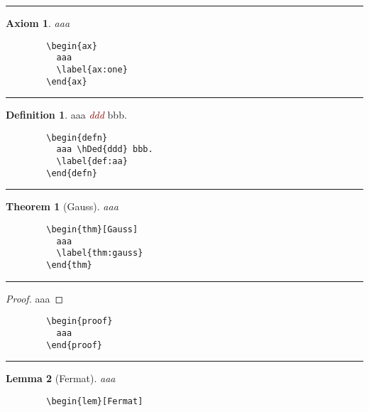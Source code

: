 \documentclass[a4paper,10pt,landscape]{article}
\newcommand{\hSep}{{\color{colorSep}\hrule}}
\newtheorem{thm}{Theorem}[section]
\newtheorem{lem}[thm]{Lemma}
\newtheorem{ax}{Axiom}
\theoremstyle{definition}
\newtheorem{defn}{Definition}[section]
\theoremstyle{remark}
\newcommand{\hDed}[1]{\textcolor{darkred}{\textit{#1}}} %
\begin{document}
\begin{multicols}{3}
\hSep
\begin{multicols}{2}
		\begin{ax}
		  aaa
		  \label{ax:one}
		\end{ax}
\columnbreak
	\begin{verbatim}
		\begin{ax}
		  aaa
		  \label{ax:one}
		\end{ax}
	\end{verbatim}
\end{multicols}
\hSep
\begin{multicols}{2}
		\begin{defn}
		  aaa \hDed{ddd} bbb.
		  \label{def:aa}
		\end{defn}
\columnbreak
	\begin{verbatim}
		\begin{defn}
		  aaa \hDed{ddd} bbb.
		  \label{def:aa}
		\end{defn}
	\end{verbatim}
\end{multicols}
\hSep
\begin{multicols}{2}
		\begin{thm}[Gauss]
		  aaa
		  \label{thm:gauss}
		\end{thm}
\columnbreak
	\begin{verbatim}
		\begin{thm}[Gauss]
		  aaa
		  \label{thm:gauss}
		\end{thm}
	\end{verbatim}
\end{multicols}
\hSep
\begin{multicols}{2}
		\begin{proof}
		  aaa
		\end{proof}
\columnbreak
	\begin{verbatim}
		\begin{proof}
		  aaa
		\end{proof}
	\end{verbatim}
\end{multicols}
\hSep
\begin{multicols}{2}
		\begin{lem}[Fermat]
		  aaa
		  \label{lem:fermat}
		\end{lem}
\columnbreak
	\begin{verbatim}
		\begin{lem}[Fermat]

\end{verbatim}
\end{multicols}
\end{multicols}
\end{document}
